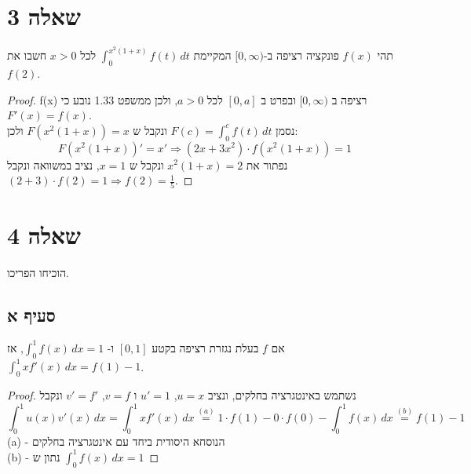 \documentclass{article}
\begin{document}
	\pagebreak
	\section*{שאלה 3}
	תהי $f(x)$ פונקציה רציפה ב-$[0, \infty)$ המקיימת $\int_0^{x^2(1+x)} f(t) \, dt$ לכל $x > 0$ חשבו את $f(2)$.

	\begin{proof}
		f(x) רציפה ב $[0, \infty)$ ובפרט ב $[0, a]$ לכל $a > 0$, ולכן ממשפט 1.33 נובע כי $F'(x) = f(x)$. \\
		נסמן $F(c) = \int_0^c f(t) \, dt$ ונקבל ש $F(x^2(1+x)) = x$ ולכן:
		\[
			F(x^2(1+x))' = x' \Rightarrow
			(2x + 3x^2) \cdot f(x^2(1+x)) = 1
		\]
		נפתור את $x^2(1 + x) = 2$ ונקבל ש $x=1$, נציב במשוואה ונקבל $(2+3) \cdot f(2) = 1 \Rightarrow \boxed{f(2) = \frac{1}{5}}$.
	\end{proof}

	\section*{שאלה 4}
	הוכיחו הפריכו.
	\subsection*{סעיף א}
	אם $f$ בעלת נגזרת רציפה בקטע $[0, 1]$ ו- $\int_0^1 f(x) \, dx = 1$, אז $\int_0^1 x f'(x) \, dx = f(1) - 1$.
	\begin{proof}
		נשתמש באינטגרציה בחלקים, ונציב $u = x$, $u' = 1$ ו $v = f$, $v' = f'$ ונקבל
		\[ \int_0^1 u(x)v'(x) \, dx = \int_0^1 x f'(x) \, dx \overset{(a)}=  1 \cdot f(1) - 0 \cdot f(0) - \int^1_0 f(x) \, dx \overset{(b)}= f(1) - 1 \]
		(a) - הנוסחא היסודית ביחד עם אינטגרציה בחלקים \\
		(b) - נתון ש $\int^1_0 f(x) \, dx = 1$
	\end{proof}
\end{document}
